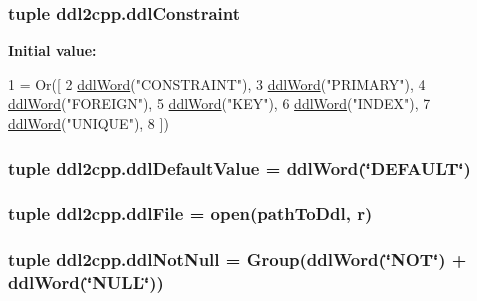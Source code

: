 \subsubsection[{ddl\+Constraint}]{\setlength{\rightskip}{0pt plus 5cm}tuple ddl2cpp.\+ddl\+Constraint}\label{namespaceddl2cpp_a97e4713ef26f221c7a6e84b47053bb04}
{\bfseries Initial value\+:}
\begin{DoxyCode}
1 = Or([
2         \hyperlink{namespaceddl2cpp_aef0136dc79fef19dc9bcece9a6fd2396}{ddlWord}(\textcolor{stringliteral}{"CONSTRAINT"}), 
3         \hyperlink{namespaceddl2cpp_aef0136dc79fef19dc9bcece9a6fd2396}{ddlWord}(\textcolor{stringliteral}{"PRIMARY"}), 
4         \hyperlink{namespaceddl2cpp_aef0136dc79fef19dc9bcece9a6fd2396}{ddlWord}(\textcolor{stringliteral}{"FOREIGN"}), 
5         \hyperlink{namespaceddl2cpp_aef0136dc79fef19dc9bcece9a6fd2396}{ddlWord}(\textcolor{stringliteral}{"KEY"}),
6         \hyperlink{namespaceddl2cpp_aef0136dc79fef19dc9bcece9a6fd2396}{ddlWord}(\textcolor{stringliteral}{"INDEX"}), 
7         \hyperlink{namespaceddl2cpp_aef0136dc79fef19dc9bcece9a6fd2396}{ddlWord}(\textcolor{stringliteral}{"UNIQUE"}), 
8         ])
\end{DoxyCode}
\hypertarget{namespaceddl2cpp_a4952a8806e1ea497a7d3cf22334247ac}{}
\subsubsection[{ddl\+Default\+Value}]{\setlength{\rightskip}{0pt plus 5cm}tuple ddl2cpp.\+ddl\+Default\+Value = {\bf ddl\+Word}(\char`\"{}D\+E\+F\+A\+U\+L\+T\char`\"{})}\label{namespaceddl2cpp_a4952a8806e1ea497a7d3cf22334247ac}
\hypertarget{namespaceddl2cpp_a6a08f77749b6af650691eaa476716dbf}{}
\subsubsection[{ddl\+File}]{\setlength{\rightskip}{0pt plus 5cm}tuple ddl2cpp.\+ddl\+File = open({\bf path\+To\+Ddl}, \textquotesingle{}r\textquotesingle{})}\label{namespaceddl2cpp_a6a08f77749b6af650691eaa476716dbf}
\hypertarget{namespaceddl2cpp_a1b17bb7ebb70fb38c91d5e21923602f9}{}
\subsubsection[{ddl\+Not\+Null}]{\setlength{\rightskip}{0pt plus 5cm}tuple ddl2cpp.\+ddl\+Not\+Null = Group({\bf ddl\+Word}(\char`\"{}N\+O\+T\char`\"{}) + ddl\+Word(\char`\"{}N\+U\+L\+L\char`\"{}))}\label{namespaceddl2cpp_a1b17bb7ebb70fb38c91d5e21923602f9}
\hypertarget{namespaceddl2cpp_a4200c1285ee30e3c5069a13092e36b7b}{}
